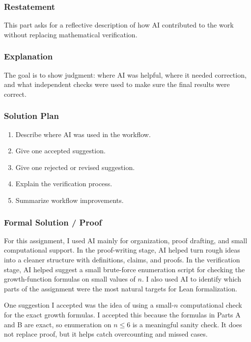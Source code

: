 \documentclass{article}
\begin{document}
\begin{solutionbox}

\subsubsection{Restatement}

This part asks for a reflective description of how AI contributed to the work
without replacing mathematical verification.

\subsubsection{Explanation}

The goal is to show judgment: where AI was helpful, where it needed correction,
and what independent checks were used to make sure the final results were
correct.

\subsubsection{Solution Plan}

\begin{enumerate}[leftmargin=2.5em]
    \item Describe where AI was used in the workflow.
    \item Give one accepted suggestion.
    \item Give one rejected or revised suggestion.
    \item Explain the verification process.
    \item Summarize workflow improvements.
\end{enumerate}

\subsubsection{Formal Solution / Proof}

For this assignment, I used AI mainly for organization, proof drafting, and
small computational support. In the proof-writing stage, AI helped turn rough
ideas into a cleaner structure with definitions, claims, and proofs. In the
verification stage, AI helped suggest a small brute-force enumeration script for
checking the growth-function formulas on small values of \(n\). I also used AI
to identify which parts of the assignment were the most natural targets for Lean
formalization.

One suggestion I accepted was the idea of using a small-\(n\) computational
check for the exact growth formulas. I accepted this because the formulas in
Parts A and B are exact, so enumeration on \(n\le 6\) is a meaningful sanity
check. It does not replace proof, but it helps catch overcounting and missed
cases.


\end{solutionbox}
\end{document}
